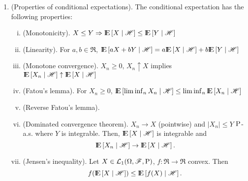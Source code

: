 \documentclass[a4paper,10pt]{article}
\newcommand{\ce}[1]{\E\left[#1 {}\mid{} \H \right]}
\begin{document}
\begin{enumerate}
 \item (Properties of conditional expectations). 
       The conditional expectation has the following properties:
       \begin{enumerate}[(i)]
	\item (Monotonicity). $X\leq Y \Rightarrow \ce{X} \leq \ce{Y}$
	\item (Linearity). For $a,b\in\Re$, $\ce{aX+bY}=a\ce{X} + b \ce{Y}$
	\item (Monotone convergence). $X_n\geq 0$, $X_n \uparrow X$ implies $\ce{X_n}\uparrow \ce{X}$
	\item (Fatou's lemma). For $X_n\geq 0$, $\ce{\liminf_n X_n}\leq \liminf_n \ce{X_n}$
	\item (Reverse Fatou's lemma).
	\item (Dominated convergence theorem). $X_n\to X$ (pointwise) and $|X_n|\leq Y$ $\mathrm{P}$-a.s. where $Y$ is
	      integrable. Then, $\ce{X}$ is integrable and 
	      \[
	       \ce{X_n} \to \ce{X}.
	      \]
        \item (Jensen's inequality). Let $X\in\mathcal{L}_1(\Omega,\mathscr{F},\mathrm{P})$, $f:\Re\to\Re$ convex. Then
	      \[
	      f(\ce{X})\leq \ce{f(X)}.
	      \]
       \end{enumerate}
\end{enumerate}
\end{document}
